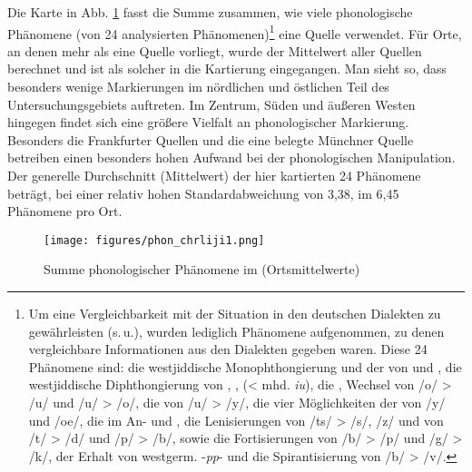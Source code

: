 Die Karte in Abb. \ref{lijiphon} fasst die Summe zusammen, wie viele phonologische Phänomene (von 24 analysierten Phänomenen)\footnote{Um eine Vergleichbarkeit mit der Situation in den deutschen Dialekten zu gewährleisten (s.\,u.), wurden lediglich Phänomene aufgenommen, zu denen vergleichbare Informationen aus den Dialekten gegeben waren. Diese 24 Phänomene sind: die westjiddische Monophthongierung und der  von  und , die westjiddische Diphthongierung von , ,  (< mhd. \textit{iu}), die , Wechsel von /o/ > /u/ und /u/ > /o/, die  von /u/ > /y/, die vier Möglichkeiten der  von /y/ und /oe/, die  im An- und , die Lenisierungen von /ts/ > /s/, /z/ und von /t/ > /d/ und /p/ > /b/, sowie die Fortisierungen von /b/ > /p/ und /g/ > /k/, der Erhalt von westgerm. -\textit{pp}- und die Spirantisierung von /b/ > /v/.} eine Quelle verwendet. Für Orte, an denen mehr als eine Quelle vorliegt, wurde der Mittelwert aller Quellen berechnet und ist als solcher in die Kartierung eingegangen. Man sieht so, dass besonders wenige Markierungen im nördlichen und östlichen Teil des Untersuchungsgebiets auftreten. Im Zentrum, Süden und äußeren Westen hingegen findet sich eine größere Vielfalt an phonologischer Markierung. Besonders die Frankfurter Quellen und die eine belegte Münchner Quelle betreiben einen besonders hohen Aufwand bei der phonologischen Manipulation. Der generelle Durchschnitt (Mittelwert) der hier kartierten 24 Phänomene beträgt, bei einer relativ hohen Standardabweichung von 3,38, im  6,45 Phänomene pro Ort. \\

\begin{figure}[h!]
		\centering
\texttt{[image: figures/phon\_chrliji1.png]}
		\caption{\label{lijiphon} Summe phonologischer Phänomene im  (Ortsmittelwerte)}
\end{figure}
\FloatBarrier


